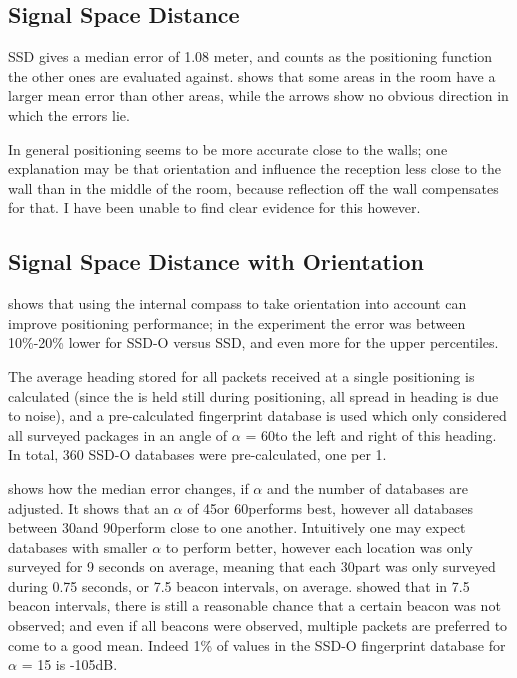\subsection{Signal Space Distance}
SSD gives a median error of 1.08 meter, and counts as the positioning function the other ones are evaluated against.
 shows that some areas in the room have a larger mean error than other areas, while the arrows show no obvious direction in which the errors lie.

In general positioning seems to be more accurate close to the walls; one explanation may be that orientation and \mpi influence the reception less close to the wall than in the middle of the room, because reflection off the wall compensates for that.
I have been unable to find clear evidence for this however.

\subsection{Signal Space Distance with Orientation}
\label{sec:architecture-measurements-ssd-o}
 shows that using the internal compass to take orientation into account can improve positioning performance; in the experiment the error was between 10\%-20\% lower for SSD-O versus SSD, and even more for the upper percentiles.

The average heading stored for all packets received at a single positioning is calculated (since the \device is held still during positioning, all spread in heading is due to noise), and a pre-calculated fingerprint database is used which only considered all surveyed packages in an angle of $\alpha$ = 60\tdegree to the left and right of this heading.
In total, 360 SSD-O databases were pre-calculated, one per 1\tdegree.

 shows how the median error changes, if $\alpha$ and the number of databases are adjusted.
It shows that an $\alpha$ of 45\tdegree or 60\tdegree performs best, however all databases between 30\tdegree and 90\tdegree perform close to one another.
Intuitively one may expect databases with smaller $\alpha$ to perform better, however each location was only surveyed for 9 seconds on average, meaning that each 30\tdegree part was only surveyed during 0.75 seconds, or 7.5 beacon intervals, on average.
 showed that in 7.5 beacon intervals, there is still a reasonable chance that a certain beacon was not observed; and even if all beacons were observed, multiple packets are preferred to come to a good mean.
Indeed 1\% of values in the SSD-O fingerprint database for $\alpha$ = 15 is -105dB.

